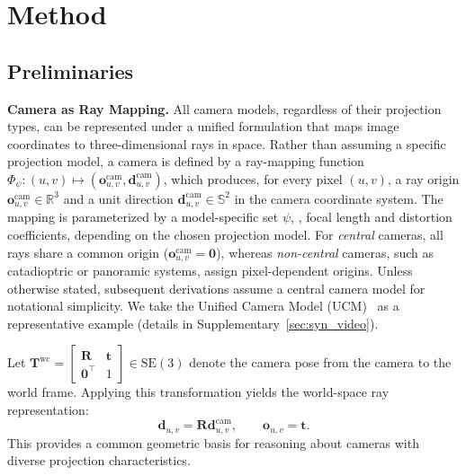 \section{Method}
\label{sec:method}

\subsection{Preliminaries}
\label{sec:prelim}

\noindent\textbf{Camera as Ray Mapping.}
All camera models, regardless of their projection types, can be represented under a unified formulation that maps image coordinates to three-dimensional rays in space. 
Rather than assuming a specific projection model, a camera is defined by a ray-mapping function
\({\Phi}_{\psi}: ({u},{v}) \mapsto (\mathbf{o}_{{u},{v}}^{\textrm{cam}}, \mathbf{d}_{{u},{v}}^\textrm{cam})\),
which produces, for every pixel \(({u},{v})\), a ray origin \(\mathbf{o}_{{u},{v}}^{\textrm{cam}} \in \mathbb{R}^3\) and a unit direction \(\mathbf{d}_{{u},{v}}^{\textrm{cam}} \in \mathbb{S}^2\) in the camera coordinate system.
The mapping is parameterized by a model-specific set \(\psi\), \eg, focal length and distortion coefficients, depending on the chosen projection model.
For \emph{central} cameras, all rays share a common origin (\(\mathbf{o}_{{u},{v}}^{\textrm{cam}} = \mathbf{0}\)),
whereas \emph{non-central} cameras, such as catadioptric or panoramic systems, assign pixel-dependent origins. 
Unless otherwise stated, subsequent derivations assume a central camera model for notational simplicity.
We take the Unified Camera Model (UCM)~\cite{mei2007single} as a representative example (details in Supplementary~\cref{sec:syn_video}).

Let \(\mathbf{T}^{\textrm{wc}} = \left[\begin{smallmatrix} \mathbf{R} & \bm{t} \\ \bm{0}^\top & 1 \end{smallmatrix}\right] \in \mathrm{SE}(3)\) denote the camera pose from the camera to the world frame.
Applying this transformation yields the world-space ray representation:
\begin{equation}
\bm{d}_{{u},{v}} = \mathbf{R} \bm{d}_{{u},{v}}^{\textrm{cam}},
\qquad
\bm{o}_{{u},{v}} = \bm{t}.
\label{eq:ray_mapping}
\end{equation}
This %
provides a common geometric basis for reasoning about cameras with diverse projection characteristics.

